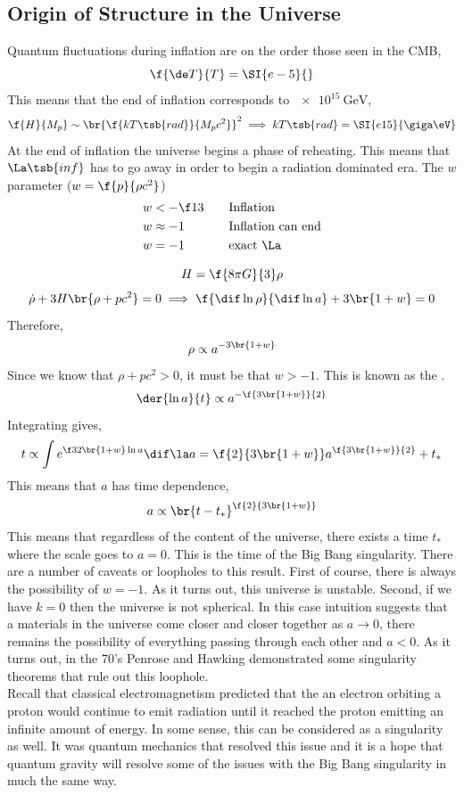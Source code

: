 \documentclass{article}
\begin{document}
\subsection{Origin of Structure in the Universe}
Quantum fluctuations during inflation are on the order those seen in the CMB,
\[  \f{\de T}{T} = \SI{e-5}{}\]
This means that the end of inflation corresponds to $\SI{e15}{\giga\eV}$,
\[ \f{H}{M_p} \sim \br{\f{k T\tsb{rad}}{M_p c^2}}^2 \implies k T\tsb{rad} = \SI{e15}{\giga\eV} \]
At the end of inflation the universe begins a phase of reheating. This means that $\La\tsb{inf}$ has to go away in order to begin a radiation dominated era. The $w$ parameter ($w = \f{p}{\rho c^2}$)
\begin{alignat*}{2}
    w &< -\f13 \quad &&\text{Inflation}\\
    w &\approx -1 \quad &&\text{Inflation can end}\\
    w &= -1 \quad &&\text{exact $\La$}
\end{alignat*}

\[ H = \f{8 \pi G}{3} \rho \]
\[ \dot \rho + 3 H \br{\rho + p c^2} = 0 \implies \f{\dif \ln \rho}{\dif \ln a} + 3 \br{1 + w} = 0 \]
Therefore,
\[ \rho \propto a^{- 3\br{1 + w}} \]
Since we know that $\rho + p c^2 > 0$, it must be that $w > -1$. This is known as the .
\[ \der{\ln a}{t} \propto a^{- \f{3\br{1 + w}}{2}} \]
Integrating gives,
\[ t \propto \int e^{\f32 \br{1 + w} \ln a} \dif \la a = \f{2}{3 \br{1 + w}} a^{\f{3\br{1 + w}}{2}} + t_{*} \]
This means that $a$ has time dependence,
\[ a \propto \br{t - t_{*}}^{\f{2}{3\br{1 + w}}} \]
This means that regardless of the content of the universe, there exists a time $t_{*}$ where the scale goes to $a = 0$. This is the time of the Big Bang singularity. There are a number of caveats or loopholes to this result. First of course, there is always the possibility of $w = -1$. As it turns out, this universe is unstable. Second, if we have $k = 0$ then the universe is not spherical. In this case intuition suggests that a materials in the universe come closer and closer together as $a \to 0$, there remains the possibility of everything passing through each other and $a < 0$. As it turns out, in the 70's Penrose and Hawking demonstrated some singularity theorems that rule out this loophole. \\

Recall that classical electromagnetism predicted that the an electron orbiting a proton would continue to emit radiation until it reached the proton emitting an infinite amount of energy. In some sense, this can be considered as a singularity as well. It was quantum mechanics that resolved this issue and it is a hope that quantum gravity will resolve some of the issues with the Big Bang singularity in much the same way. \\
\end{document}
